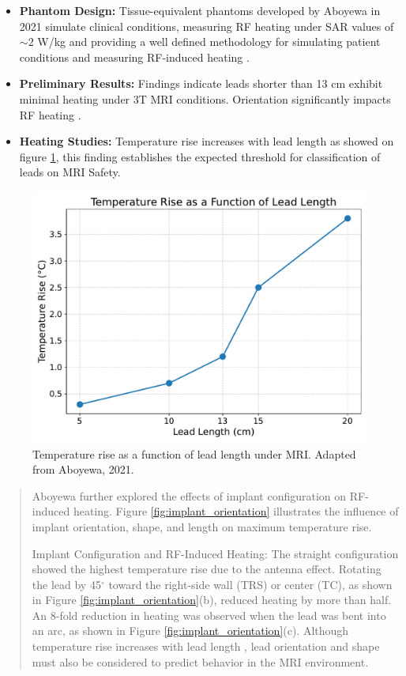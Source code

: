 \documentclass[final]{article}
\newcommand{\boldtext}[1]{{\fontseries{b}\selectfont #1}}
\begin{document}
\begin{multicols}{3}
\begin{itemize}
    \item \textbf{Phantom Design:} Tissue-equivalent phantoms developed by Aboyewa in 2021 simulate clinical conditions, measuring RF heating under SAR values of $\sim$2 W/kg and providing a well defined methodology for simulating patient conditions and measuring RF-induced heating \cite{aboyewa2021}.
    \item \textbf{Preliminary Results:} Findings indicate leads shorter than 13 cm exhibit minimal heating under 3T MRI conditions. Orientation significantly impacts RF heating \cite{aboyewa2021}.
    \item \textbf{Heating Studies:} Temperature rise increases with lead length as showed on figure \ref{fig:lead_temp_rise}, this finding establishes the expected threshold for classification of leads on MRI Safety.
\end{itemize}


\begin{figure}[H]
    \centering
    \includegraphics[width=0.5\linewidth]{FigTab.pdf} %
    \caption{Temperature rise as a function of lead length under MRI. Adapted from Aboyewa, 2021.}
    \label{fig:lead_temp_rise}
\end{figure}

\begin{quote}
Aboyewa further explored the effects of implant configuration on RF-induced heating. Figure \ref{fig:implant_orientation} illustrates the influence of implant orientation, shape, and length on maximum temperature rise.

\boldtext{Implant Configuration and RF-Induced Heating:} 
The straight configuration showed the highest temperature rise due to the antenna effect. Rotating the lead by 45$^\circ$ toward the right-side wall (TRS) or center (TC), as shown in Figure \ref{fig:implant_orientation}(b), reduced heating by more than half. An 8-fold reduction in heating was observed when the lead was bent into an arc, as shown in Figure \ref{fig:implant_orientation}(c). Although temperature rise increases with lead length \cite{aboyewa2021}, lead orientation and shape must also be considered to predict behavior in the MRI environment.  
\end{quote}




\end{multicols}
\end{document}
